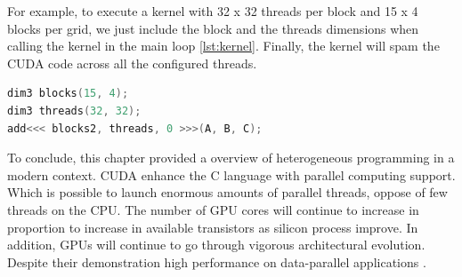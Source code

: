 For example, to execute a kernel with 32 x 32 threads per block and 15 x 4 blocks per grid, we just include the block and the threads dimensions when calling the kernel in the main loop \ref{lst:kernel}. Finally, the kernel will spam the CUDA code across all the configured threads.

\begin{lstlisting}[language=C++, label={lst:kernel}, caption={kernel call}]
dim3 blocks(15, 4);
dim3 threads(32, 32);
add<<< blocks2, threads, 0 >>>(A, B, C);
\end{lstlisting}


\vspace{3.2em}


To conclude, this chapter provided a overview of heterogeneous programming in a modern context. CUDA  enhance the C language with parallel computing support. Which is possible to launch  enormous amounts of parallel threads, oppose of few threads on the CPU. The number of GPU cores will continue to increase in proportion to increase in available transistors as silicon process improve. In addition, GPUs will continue to go through vigorous architectural evolution. Despite their demonstration high performance on data-parallel applications \cite{hwu}.







